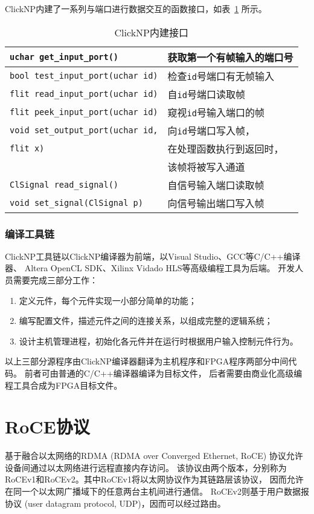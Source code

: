 ClickNP内建了一系列与端口进行数据交互的函数接口，如表~\ref{tab:operations} 所示。
\begin{table}[htbp]
\centering
\caption{ClickNP内建接口} \label{tab:operations}
\begin{tabular}{l|l}
\hline
\lstinline$uchar get_input_port()$         & 获取第一个有帧输入的端口号 \\
\hline
\lstinline$bool test_input_port(uchar id)$ & 检查\lstinline$id$号端口有无帧输入 \\
\hline
\lstinline$flit read_input_port(uchar id)$ & 自\lstinline$id$号端口读取帧 \\
\hline
\lstinline$flit peek_input_port(uchar id)$ & 窥视\lstinline$id$号输入端口的帧 \\
\hline
\lstinline$void set_output_port(uchar id,$ & 向\lstinline$id$号端口写入帧， \\
\lstinline$flit x)$                        & 在处理函数执行到返回时， \\
                                           & 该帧将被写入通道 \\
\hline
\lstinline$ClSignal read_signal()$         & 自信号输入端口读取帧 \\
\hline
\lstinline$void set_signal(ClSignal p)$    & 向信号输出端口写入帧 \\
\hline
\end{tabular}
\end{table}

\subsubsection{编译工具链}
ClickNP工具链以ClickNP编译器为前端，以Visual Studio、GCC等C/C++编译器、
Altera OpenCL SDK、Xilinx Vidado HLS等高级编程工具为后端。
开发人员需要完成三部分工作：
\begin{enumerate}
\item 定义元件，每个元件实现一小部分简单的功能；
\item 编写配置文件，描述元件之间的连接关系，以组成完整的逻辑系统；
\item 设计主机管理进程，初始化各元件并在运行时根据用户输入控制元件行为。
\end{enumerate}

以上三部分源程序由ClickNP编译器翻译为主机程序和FPGA程序两部分中间代码。
前者可由普通的C/C++编译器编译为目标文件，
后者需要由商业化高级编程工具合成为FPGA目标文件。



\section{RoCE协议}
基于融合以太网络的RDMA (RDMA over Converged Ethernet, RoCE) 协议允许设备间通过以太网络进行远程直接内存访问。
该协议由两个版本，分别称为RoCEv1和RoCEv2。其中RoCEv1将以太网协议作为其链路层该协议，
因而允许在同一个以太网广播域下的任意两台主机间进行通信\cite{a16}。
RoCEv2则基于用户数据报协议 (user datagram protocol, UDP)，因而可以经过路由\cite{a17, considerations, storage}。


